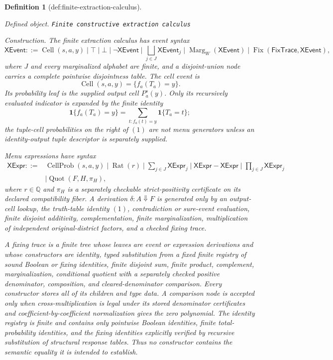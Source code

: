 \documentclass{article}
\newtheorem{definition}{Definition}
\begin{document}
\begin{definition}[def:finite-extraction-calculus]\label{def:finite-extraction-calculus}
\par\smallskip\noindent\emph{Defined object.} \texttt{Finite constructive extraction calculus}
\par\smallskip\noindent\emph{Construction.} The finite extraction calculus has event syntax
\[
\mathsf{XEvent}::=
\operatorname{Cell}(s,a,y)\mid\top\mid\bot\mid
\neg\mathsf{XEvent}\mid
\bigsqcup_{j\in J}\mathsf{XEvent}_j\mid
\operatorname{Marg}_{W}(\mathsf{XEvent})\mid
\operatorname{Fix}(\mathsf{FixTrace},\mathsf{XEvent}),
\]
where \(J\) and every marginalized alphabet are finite, and a disjoint-union node carries a complete pointwise disjointness table.  The cell event is
\[
\operatorname{Cell}(s,a,y)=\{f_a(T_a)=y\}.
\]
Its probability leaf is the supplied output cell \(P_a^s(y)\).  Only its recursively evaluated indicator is expanded by the finite identity
\[
\mathbf 1\{f_a(T_a)=y\}
=\sum_{t:f_a(t)=y}\mathbf 1\{T_a=t\};
\tag{1}
\]
the tuple-cell probabilities on the right of \((1)\) are not menu generators unless an identity-output tuple descriptor is separately supplied.

Menu expressions have syntax
\[
\begin{split}
\mathsf{XExpr}::={}&
\operatorname{CellProb}(s,a,y)\mid\operatorname{Rat}(r)
\mid\sum_{j\in J}\mathsf{XExpr}_j
\mid\mathsf{XExpr}-\mathsf{XExpr}
\mid\prod_{j\in J}\mathsf{XExpr}_j\\
&\mid\operatorname{Quot}(F,H,\pi_H),
\end{split}
\]
where \(r\in\mathbb Q\) and \(\pi_H\) is a separately checkable strict-positivity certificate on its declared compatibility fiber.  A derivation \(\delta:A\Downarrow F\) is generated only by an output-cell lookup, the truth-table identity \((1)\), contradiction or sure-event evaluation, finite disjoint additivity, complementation, finite marginalization, multiplication of independent original-district factors, and a checked fixing trace.

A fixing trace is a finite tree whose leaves are event or expression derivations and whose constructors are identity, typed substitution from a fixed finite registry of sound Boolean or fixing identities, finite disjoint sum, finite product, complement, marginalization, conditional quotient with a separately checked positive denominator, composition, and cleared-denominator comparison.  Every constructor stores all of its children and type data.  A comparison node is accepted only when cross-multiplication is legal under its stored denominator certificates and coefficient-by-coefficient normalization gives the zero polynomial.  The identity registry is finite and contains only pointwise Boolean identities, finite total-probability identities, and the fixing identities explicitly verified by recursive substitution of structural response tables.  Thus no constructor contains the semantic equality it is intended to establish.


\end{definition}
\end{document}
